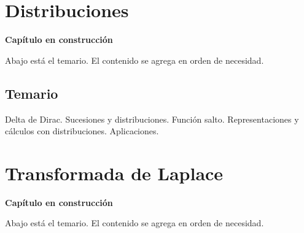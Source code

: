 \documentclass[
  spanish,
  a4paper,
]{scrbook}
\theoremstyle{definition}
\theoremstyle{plain}
\theoremstyle{definition}
\theoremstyle{plain}
\theoremstyle{definition}
\theoremstyle{remark}
\begin{document}
\chapter{Distribuciones}\label{sec-distribuciones}

\begin{tcolorbox}[enhanced jigsaw, arc=.35mm, bottomrule=.15mm, breakable, colback=white, colframe=quarto-callout-note-color-frame, left=2mm, leftrule=.75mm, opacityback=0, rightrule=.15mm, toprule=.15mm]
\begin{minipage}[t]{5.5mm}
\textcolor{quarto-callout-note-color}{\faInfo}
\end{minipage}%
\begin{minipage}[t]{\textwidth - 5.5mm}

\vspace{-3mm}\textbf{Capítulo en construcción}\vspace{3mm}

Abajo está el temario. El contenido se agrega en orden de necesidad.

\end{minipage}%
\end{tcolorbox}

\section*{Temario}\label{temario-4}


Delta de Dirac. Sucesiones y distribuciones. Función salto.
Representaciones y cálculos con distribuciones. Aplicaciones.

\chapter{Transformada de Laplace}\label{sec-laplace}

\begin{tcolorbox}[enhanced jigsaw, arc=.35mm, bottomrule=.15mm, breakable, colback=white, colframe=quarto-callout-note-color-frame, left=2mm, leftrule=.75mm, opacityback=0, rightrule=.15mm, toprule=.15mm]
\begin{minipage}[t]{5.5mm}
\textcolor{quarto-callout-note-color}{\faInfo}
\end{minipage}%
\begin{minipage}[t]{\textwidth - 5.5mm}

\vspace{-3mm}\textbf{Capítulo en construcción}\vspace{3mm}

Abajo está el temario. El contenido se agrega en orden de necesidad.

\end{minipage}%
\end{tcolorbox}
\end{document}
